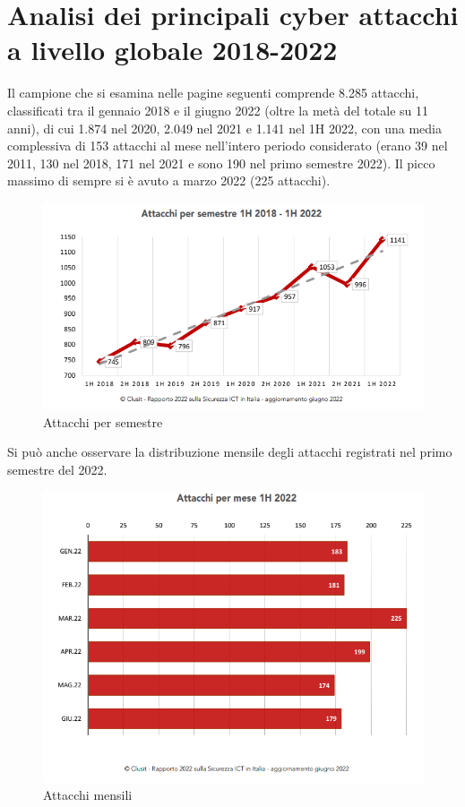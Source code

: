 \section [Analisi cyber attacchi a livello globale] {Analisi dei principali cyber attacchi a livello globale 2018-2022}
Il campione che si esamina nelle pagine seguenti comprende 8.285 attacchi, classificati tra il gennaio 2018 e il giugno 2022 (oltre la metà del totale su 11 anni), di cui 1.874 nel 2020, 2.049 nel 2021 e 1.141 nel 1H 2022, con una media complessiva di 153 attacchi al mese nell’intero periodo considerato (erano 39 nel 2011, 130 nel 2018, 171 nel 2021 e sono 190 nel primo semestre 2022). Il picco massimo di sempre si è avuto a marzo 2022 (225 attacchi). 


\begin{figure}[H]
    \centering
    \includegraphics[scale=0.8]{Immagini/img1.png}
    \caption{Attacchi per semestre}
    \label{fig:AttacchiSemestre}
\end{figure}

Si può anche osservare la distribuzione mensile degli attacchi registrati nel primo semestre del 2022.

\begin{figure}[H]
    \centering
    \includegraphics[scale=0.8]{Immagini/img2.png}
    \caption{Attacchi mensili}
    \label{fig:AttacchiMensili}
\end{figure}

